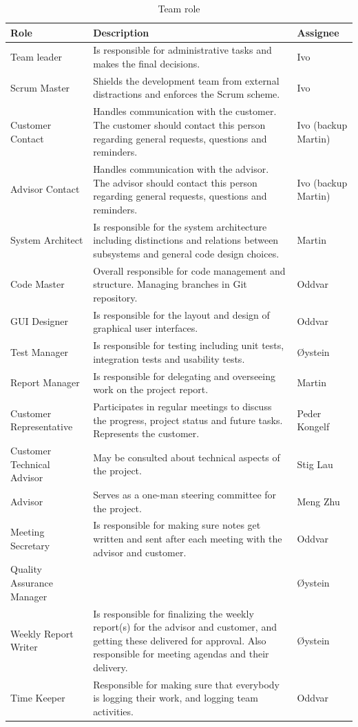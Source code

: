 \begin{table}
\begin{tabularx}{\textwidth}{ | l | X | l | }
  \hline
  \textbf{Role} & \textbf{Description} & \textbf{Assignee} \\ 
  \hline
  Team leader & Is responsible for administrative tasks and makes the final decisions. & Ivo \\ 
  \hline
  Scrum Master & Shields the development team from external distractions and enforces the Scrum scheme.  & Ivo \\ 
  \hline
  Customer Contact & Handles communication with the customer. The customer should contact this person regarding general requests, questions and reminders. & Ivo (backup Martin) \\ 
  \hline
  Advisor Contact & Handles communication with the advisor. The advisor should contact this person regarding general requests, questions and reminders.  & Ivo (backup Martin) \\ 
  \hline
  System Architect & Is responsible for the system architecture including distinctions and relations between subsystems and general code design choices. & Martin \\ 
  \hline
  Code Master & Overall responsible for code management and structure. Managing branches in Git repository. & Oddvar  \\ 
  \hline
  GUI Designer & Is responsible for the layout and design of graphical user interfaces. & Oddvar \\ 
  \hline
  Test Manager & Is responsible for testing including unit tests, integration tests and usability tests. & Øystein \\ 
  \hline
  Report Manager & Is responsible for delegating and overseeing work on the project report. & Martin \\ 
  \hline
  Customer Representative & Participates in regular meetings to discuss the progress, project status and future tasks. Represents the customer. & Peder Kongelf \\ 
  \hline
  Customer Technical Advisor & May be consulted about technical aspects of the project. & Stig Lau \\ 
  \hline
  Advisor & Serves as a one-man steering committee for the project. & Meng Zhu \\ 
  \hline
  Meeting Secretary & Is responsible for making sure notes get written and sent after each meeting with the advisor and customer. & Oddvar \\ 
  \hline
  Quality Assurance Manager &  & Øystein \\ 
  \hline
  Weekly Report Writer & Is responsible for finalizing the weekly report(s) for the advisor and customer, and getting these delivered for approval. Also responsible for meeting agendas and their delivery. & Øystein \\ 
  \hline
  Time Keeper & Responsible for making sure that everybody is logging their work, and logging team activities. & Oddvar \\ 
  \hline
\end{tabularx}
\caption{Team role}
\label{table-teamroles}
\end{table}

